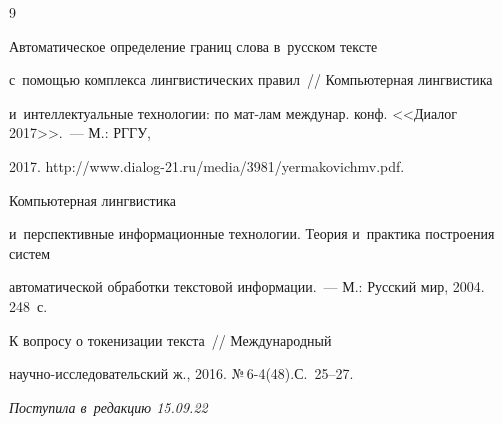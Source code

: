 {\small\frenchspacing


{%




\begin{thebibliography}{9}  




   Автоматическое определение границ слова в~русском тексте  


с~по\-мощью комплекса лингвистических правил~/\!\!/ Компьютерная лингвистика 


и~интеллектуальные технологии: по мат-лам междунар. конф. <<Диалог 2017>>.~--- М.: РГГУ, 


2017. {\sf http://www.dialog-21.ru/media/3981/yermakovichmv.pdf}.




   Компьютерная лингвистика 


и~перспективные информационные технологии. Теория и~практика построения сис\-тем 


автоматической обработки текстовой информации.~--- М.: Русский мир, 2004. 248~с. 




   К вопросу о токенизации текста~/\!\!/ Международный  


на\-уч\-но-ис\-сле\-до\-ва\-тель\-ский ж., 2016. №\,6-4(48).С.~25--27.


 \end{thebibliography}


} }











\vspace*{-6pt}





\hfill{\small\textit{Поступила в~редакцию 15.09.22}}
















